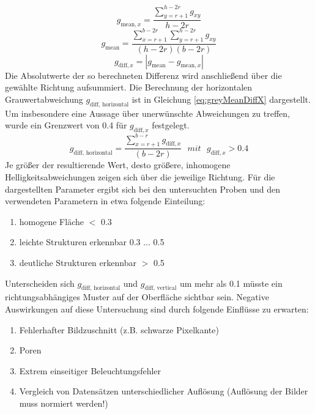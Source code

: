 \documentclass{article}
\begin{document}
\begin{equation}
	g_{\text{mean}, x} = \frac{ \sum \limits_{y=r+1}^{h-2r} g_{xy} }{h-2r} 
	\label{eq:greyMeanX}
\end{equation}
\begin{equation}
	g_\text{mean} = \frac{ \sum \limits_{x=r+1}^{b-2r} \sum \limits_{y=r+1}^{h-2r} g_{xy} }{(h-2r)(b-2r)}
	\label{eq:greyMean}
\end{equation}
\begin{equation}
	g_{\text{diff}, x} = \left| g_\text{mean} - g_{\text{mean}, x} \right|  
	\label{eq:greyMean}
\end{equation}
Die Absolutwerte der so berechneten Differenz wird anschließend über die gewählte Richtung aufsummiert.
Die Berechnung der horizontalen Grauwertabweichung $g_\text{diff, horizontal}$ ist in Gleichung \ref{eq:greyMeanDiffX} dargestellt.
Um insbesondere eine Aussage über unerwünschte Abweichungen zu treffen, wurde ein Grenzwert von 0.4 für $g_{\text{diff}, x}$ festgelegt.
\begin{equation}
	g_\text{diff, horizontal} = \frac{ \sum \limits_{x=r+1}^{b-r} g_{\text{diff}, x}}{(b-2r)} ~~~ mit ~~~ g_{\text{diff}, x} > 0.4
	\label{eq:greyMeanDiffX}
\end{equation}
Je größer der resultierende Wert, desto größere, inhomogene Helligkeitsabweichungen zeigen sich über die jeweilige Richtung.
Für die dargestellten Parameter ergibt sich bei den untersuchten Proben und den verwendeten Parametern in etwa folgende Einteilung:
\begin{enumerate}
	\item homogene Fläche $<$ 0.3
	\item leichte Strukturen erkennbar 0.3 ... 0.5
	\item deutliche Strukturen erkennbar $>$ 0.5
\end{enumerate}
Unterscheiden sich $g_\text{diff, horizontal}$ und $g_\text{diff, vertical}$ um mehr als 0.1 müsste ein richtungsabhängiges Muster auf der Oberfläche sichtbar sein. 
Negative Auswirkungen auf diese Untersuchung sind durch folgende Einflüsse zu erwarten:
\begin{enumerate}
	\item Fehlerhafter Bildzuschnitt (z.B. schwarze Pixelkante)
	\item Poren
	\item Extrem einseitiger Beleuchtungsfehler
	\item Vergleich von Datensätzen unterschiedlicher Auflösung (Auflösung der Bilder muss normiert werden!)
\end{enumerate}
\end{document}
